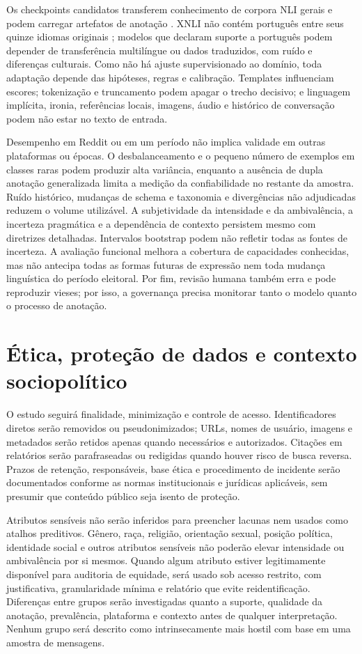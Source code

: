 Os checkpoints candidatos transferem conhecimento de corpora NLI gerais e podem carregar artefatos de anotação \cite{gururangan2018}. XNLI não contém português entre seus quinze idiomas originais \cite{conneau2018xnli}; modelos que declaram suporte a português podem depender de transferência multilíngue ou dados traduzidos, com ruído e diferenças culturais. Como não há ajuste supervisionado ao domínio, toda adaptação depende das hipóteses, regras e calibração. Templates influenciam escores; tokenização e truncamento podem apagar o trecho decisivo; e linguagem implícita, ironia, referências locais, imagens, áudio e histórico de conversação podem não estar no texto de entrada.

Desempenho em Reddit ou em um período não implica validade em outras plataformas ou épocas. O desbalanceamento e o pequeno número de exemplos em classes raras podem produzir alta variância, enquanto a ausência de dupla anotação generalizada limita a medição da confiabilidade no restante da amostra. Ruído histórico, mudanças de schema e taxonomia e divergências não adjudicadas reduzem o volume utilizável. A subjetividade da intensidade e da ambivalência, a incerteza pragmática e a dependência de contexto persistem mesmo com diretrizes detalhadas. Intervalos bootstrap podem não refletir todas as fontes de incerteza. A avaliação funcional melhora a cobertura de capacidades conhecidas, mas não antecipa todas as formas futuras de expressão nem toda mudança linguística do período eleitoral. Por fim, revisão humana também erra e pode reproduzir vieses; por isso, a governança precisa monitorar tanto o modelo quanto o processo de anotação.

\section{Ética, proteção de dados e contexto sociopolítico}

O estudo seguirá finalidade, minimização e controle de acesso. Identificadores diretos serão removidos ou pseudonimizados; URLs, nomes de usuário, imagens e metadados serão retidos apenas quando necessários e autorizados. Citações em relatórios serão parafraseadas ou redigidas quando houver risco de busca reversa. Prazos de retenção, responsáveis, base ética e procedimento de incidente serão documentados conforme as normas institucionais e jurídicas aplicáveis, sem presumir que conteúdo público seja isento de proteção.

Atributos sensíveis não serão inferidos para preencher lacunas nem usados como atalhos preditivos. Gênero, raça, religião, orientação sexual, posição política, identidade social e outros atributos sensíveis não poderão elevar intensidade ou ambivalência por si mesmos. Quando algum atributo estiver legitimamente disponível para auditoria de equidade, será usado sob acesso restrito, com justificativa, granularidade mínima e relatório que evite reidentificação. Diferenças entre grupos serão investigadas quanto a suporte, qualidade da anotação, prevalência, plataforma e contexto antes de qualquer interpretação. Nenhum grupo será descrito como intrinsecamente mais hostil com base em uma amostra de mensagens.

